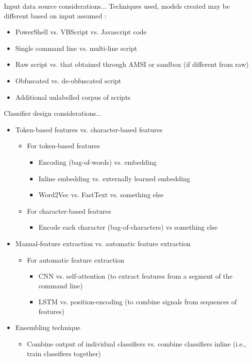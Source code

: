 \documentclass[10pt]{beamer}
\begin{document}
\begin{frame}{Input data source considerations...}
	Techniques used, models created may be different based on input assumed \cite{msft2017-2,msft2019,feye2018}:
	\begin{itemize}
		\item PowerShell vs. VBScript vs. Javascript code 
		\item Single command line vs. multi-line script
		\item Raw script vs. that obtained through AMSI or sandbox (if different from raw)
		\item Obfuscated vs. de-obfuscated script
		\item Additional unlabelled corpus of scripts
	\end{itemize}
\end{frame}

\begin{frame}{Classifier design considerations...}
	\begin{itemize}
		\item Token-based features vs. character-based features
		\begin{itemize}
			\item For token-based features
			\begin{itemize}
				\item Encoding (bag-of-words) vs. embedding
				\item Inline embedding vs. externally learned embedding
				\item Word2Vec vs. FastText vs. something else
			\end{itemize}
			\item For character-based features
			\begin{itemize}
				\item Encode each character (bag-of-characters) vs something else
			\end{itemize}
		\end{itemize}
		\item Manual-feature extraction vs. automatic feature extraction
		\begin{itemize}
			\item For automatic feature extraction
			\begin{itemize}
				\item CNN vs. self-attention (to extract features from a segment of the command line)
				\item LSTM vs. position-encoding (to combine signals from sequences of features)
			\end{itemize}
		\end{itemize}
		\item Ensembling technique
		\begin{itemize}
			\item Combine output of individual classifiers vs. combine classifiers inline (i.e., train classifiers together)
		\end{itemize}
	\end{itemize}
\end{frame}
\end{document}
